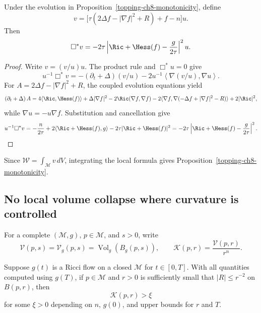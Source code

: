 \begin{proposition}
\label{topping-ch8-local-monotonicity}

Under the evolution in Proposition~\ref{topping-ch8-monotonicity}, define
\[
v=\bigl[\tau(2\Delta f-|\nabla f|^2+R)+f-n\bigr]u.
\]
Then
\[
\Box^*v=-2\tau\left|\Ric+\Hess(f)-\frac{g}{2\tau}\right|^2u.
\]
\end{proposition}

\begin{proof}
\sketch Write $v=(v/u)u$. The product rule and $\Box^*u=0$ give
\[
u^{-1}\Box^*v=-\left(\partial_t+\Delta\right)(v/u)
-2u^{-1}\left\langle\nabla(v/u),\nabla u\right\rangle.
\]
For $A=2\Delta f-|\nabla f|^2+R$, the coupled evolution equations yield
\[
\left(\partial_t+\Delta\right)A
=4\langle\Ric,\Hess(f)\rangle+\Delta|\nabla f|^2
-2\Ric(\nabla f,\nabla f)
-2\langle\nabla f,\nabla(-\Delta f+|\nabla f|^2-R)\rangle+2|\Ric|^2,
\]
while $\nabla u=-u\nabla f$. Substitution and cancellation give
\[
u^{-1}\Box^*v
=-\frac{n}{2\tau}+2\langle\Ric+\Hess(f),g\rangle
-2\tau|\Ric+\Hess(f)|^2
=-2\tau\left|\Ric+\Hess(f)-\frac{g}{2\tau}\right|^2.
\]
\end{proof}

\begin{remark}
\label{topping-ch8-proposition-implies-monotonicity}
Since $\mathcal W=\int_{\mathcal M}v\,dV$, integrating the local formula
gives Proposition~\ref{topping-ch8-monotonicity}.
\end{remark}

\subsection{No local volume collapse where curvature is controlled}

For a complete $(\mathcal M,g)$, $p\in\mathcal M$, and $s>0$, write
\[
\mathcal V(p,s)=\mathcal V_g(p,s)=\operatorname{Vol}_g(B_g(p,s)),
\qquad
\mathcal K(p,r)=\frac{\mathcal V(p,r)}{r^n}.
\]

\begin{theorem}
\label{topping-ch8-no-collapsing}

Suppose $g(t)$ is a Ricci flow on a closed $\mathcal M$ for $t\in[0,T]$.
With all quantities computed using $g(T)$, if $p\in\mathcal M$ and $r>0$ is
sufficiently small that $|R|\leq r^{-2}$ on $B(p,r)$, then
\[
\mathcal K(p,r)>\xi
\]
for some $\xi>0$ depending on $n$, $g(0)$, and upper bounds for $r$ and $T$.
\end{theorem}

